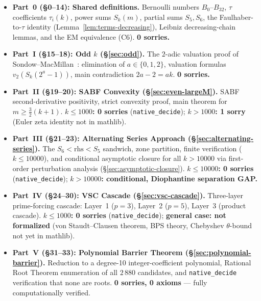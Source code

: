 \documentclass[12pt,a4paper]{article}
\theoremstyle{plain}
\theoremstyle{definition}
\begin{document}
\begin{itemize}[nosep]
  \item \textbf{Part~0 (§0--14): Shared definitions.} Bernoulli numbers
    $B_0$--$B_{32}$, $\tau$ coefficients $\tau_i(k)$, power sums $S_k(m)$,
    partial sums $S_5,S_6$, the Faulhaber-to-$\tau$ identity
    (Lemma~\ref{lem:terms-decreasing}), Leibniz decreasing-chain lemmas,
    and the EM equivalence (C6).  \textbf{0 sorries.}
  \item \textbf{Part~I (§15--18): Odd $k$ (\S\ref{sec:odd}).} The $2$-adic
    valuation proof of Sondow--MacMillan~\cite{SondowMacMillan}: elimination
    of $a \in \{0,1,2\}$, valuation formulas $v_2(S_k(2^a-1))$, main
    contradiction $2a-2 = ak$.  \textbf{0 sorries.}
  \item \textbf{Part~II (§19--20): SABF Convexity (\S\ref{sec:even-largeM}).}
    SABF second-derivative positivity, strict convexity proof, main theorem
    for $m \ge \frac{3}{2}(k+1)$.  \textbf{$k \le 1000$: 0 sorries}
    (\texttt{native\_decide}); \textbf{$k > 1000$: 1 sorry}
    (Euler zeta identity not in mathlib).
  \item \textbf{Part~III (§21--23): Alternating Series Approach (\S\ref{sec:alternating-series}).}  The $S_6 < \mathrm{rhs} < S_5$ sandwich, zone partition,
    finite verification ($k \le 10000$), and conditional asymptotic closure for
    all $k > 10000$ via first-order perturbation analysis
    (\S\ref{sec:asymptotic-closure}).
    \textbf{$k \le 10000$: 0 sorries} (\texttt{native\_decide});
    \textbf{$k > 10000$: conditional, Diophantine separation GAP.}
  \item \textbf{Part~IV (§24--30): VSC Cascade (\S\ref{sec:vsc-cascade}).}
    Three-layer prime-forcing cascade: Layer~1 ($p=3$), Layer~2 ($p=5$),
    Layer~3 (product cascade).  \textbf{$k \le 1000$: 0 sorries}
    (\texttt{native\_decide}); \textbf{general case: not formalized}
    (von Staudt--Clausen theorem, BPS theory, Chebyshev $\theta$-bound
    not yet in mathlib).
  \item \textbf{Part~V (§31--33): Polynomial Barrier Theorem (\S\ref{sec:polynomial-barrier}).}
    Reduction to a degree-10 integer-coefficient polynomial, Rational Root
    Theorem enumeration of all $2\,880$ candidates, and
    \texttt{native\_decide} verification that none are roots.
    \textbf{0 sorries, 0 axioms} --- fully computationally verified.
\end{itemize}
\end{document}
